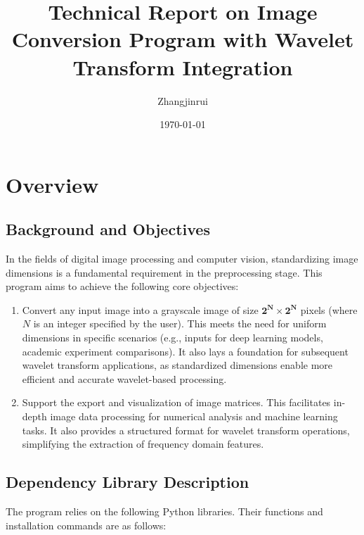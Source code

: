 \documentclass[12pt,a4paper]{article}
\title{Technical Report on Image Conversion Program with Wavelet Transform Integration}
\author{Zhangjinrui}
\date{\today}
\begin{document}
\maketitle

\section{Overview}
\subsection{Background and Objectives}
In the fields of digital image processing and computer vision, standardizing image dimensions is a fundamental requirement in the preprocessing stage. This program aims to achieve the following core objectives:  
\begin{enumerate}
    \item Convert any input image into a grayscale image of size \(\mathbf{2^N \times 2^N}\) pixels (where \(N\) is an integer specified by the user). This meets the need for uniform dimensions in specific scenarios (e.g., inputs for deep learning models, academic experiment comparisons). It also lays a foundation for subsequent wavelet transform applications, as standardized dimensions enable more efficient and accurate wavelet-based processing.  
    \item Support the export and visualization of image matrices. This facilitates in-depth image data processing for numerical analysis and machine learning tasks. It also provides a structured format for wavelet transform operations, simplifying the extraction of frequency domain features.  
\end{enumerate}

\subsection{Dependency Library Description}
The program relies on the following Python libraries. Their functions and installation commands are as follows:  
\end{document}
